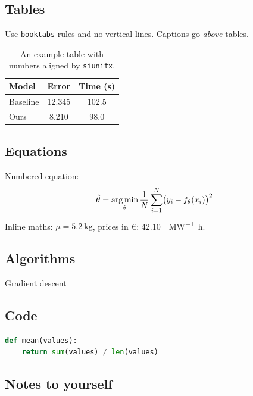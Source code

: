 \subsection{Tables}
Use \texttt{booktabs} rules and no vertical lines.
Captions go \emph{above} tables.

\begin{table}[htbp]
  \centering
  \caption{An example table with numbers aligned by \texttt{siunitx}.}
  \label{tab:example}
  \begin{tabular}{l S[table-format=2.3] S[table-format=3.1]}
    \toprule
    Model & {Error} & {Time (\si{\second})} \\
    \midrule
    Baseline & 12.345 & 102.5 \\
    Ours     &  8.210 &  98.0 \\
    \bottomrule
  \end{tabular}
\end{table}

\subsection{Equations}
Numbered equation:
\begin{equation}
  \hat{\theta} = \operatorname*{arg\,min}_{\theta} \frac{1}{N} \sum_{i=1}^{N}
  \bigl( y_i - f_\theta(x_i) \bigr)^2
  \label{eq:example}
\end{equation}
Inline maths: $\mu = \SI{5.2}{\kilo\gram}$, prices in
\euro{}: \SI{42.10}{\text{\euro}\per\mega\watt\hour}.

\subsection{Algorithms}
\begin{algorithm}[htbp]
  \caption{Gradient descent}
  \label{alg:example}
\end{algorithm}

\subsection{Code}
\begin{lstlisting}[language=Python, caption={A short code listing.}]
def mean(values):
    return sum(values) / len(values)
\end{lstlisting}

\subsection{Notes to yourself}
